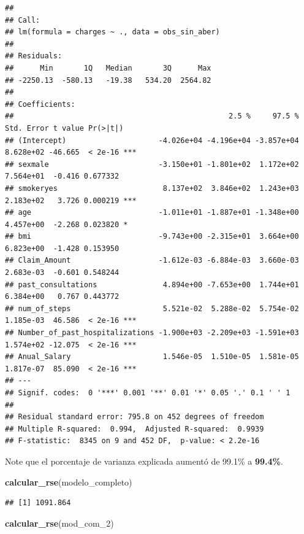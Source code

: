 \documentclass[
]{article}
\newenvironment{Shaded}{\begin{snugshade}}{\end{snugshade}}
\newcommand{\FunctionTok}[1]{\textcolor[rgb]{0.13,0.29,0.53}{\textbf{#1}}}
\newcommand{\NormalTok}[1]{#1}
\begin{document}
\begin{verbatim}
## 
## Call:
## lm(formula = charges ~ ., data = obs_sin_aber)
## 
## Residuals:
##      Min       1Q   Median       3Q      Max 
## -2250.13  -580.13   -19.38   534.20  2564.82 
## 
## Coefficients:
##                                                 2.5 %     97.5 % Std. Error t value Pr(>|t|)    
## (Intercept)                     -4.026e+04 -4.196e+04 -3.857e+04  8.628e+02 -46.665  < 2e-16 ***
## sexmale                         -3.150e+01 -1.801e+02  1.172e+02  7.564e+01  -0.416 0.677332    
## smokeryes                        8.137e+02  3.846e+02  1.243e+03  2.183e+02   3.726 0.000219 ***
## age                             -1.011e+01 -1.887e+01 -1.348e+00  4.457e+00  -2.268 0.023820 *  
## bmi                             -9.743e+00 -2.315e+01  3.664e+00  6.823e+00  -1.428 0.153950    
## Claim_Amount                    -1.612e-03 -6.884e-03  3.660e-03  2.683e-03  -0.601 0.548244    
## past_consultations               4.894e+00 -7.653e+00  1.744e+01  6.384e+00   0.767 0.443772    
## num_of_steps                     5.521e-02  5.288e-02  5.754e-02  1.185e-03  46.586  < 2e-16 ***
## Number_of_past_hospitalizations -1.900e+03 -2.209e+03 -1.591e+03  1.574e+02 -12.075  < 2e-16 ***
## Anual_Salary                     1.546e-05  1.510e-05  1.581e-05  1.817e-07  85.090  < 2e-16 ***
## ---
## Signif. codes:  0 '***' 0.001 '**' 0.01 '*' 0.05 '.' 0.1 ' ' 1
## 
## Residual standard error: 795.8 on 452 degrees of freedom
## Multiple R-squared:  0.994,  Adjusted R-squared:  0.9939 
## F-statistic:  8345 on 9 and 452 DF,  p-value: < 2.2e-16
\end{verbatim}

Note que el porcentaje de varianza explicada aumentó de 99.1\% a
\textbf{99.4\%}.

\begin{Shaded}
\begin{Highlighting}[]
\FunctionTok{calcular\_rse}\NormalTok{(modelo\_completo)}
\end{Highlighting}
\end{Shaded}

\begin{verbatim}
## [1] 1091.864
\end{verbatim}

\begin{Shaded}
\begin{Highlighting}[]
\FunctionTok{calcular\_rse}\NormalTok{(mod\_com\_2)}
\end{Highlighting}
\end{Shaded}
\end{document}
